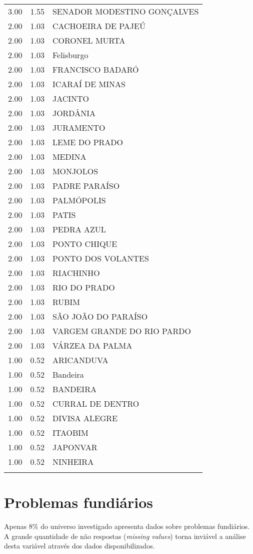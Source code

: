 \documentclass[a4paper, 12pt, openright, oneside, english, brazil, article]{abntex2}
\begin{document}
\begin{scriptsize}
\begin{longtable}{rrl}
		3.00 & 1.55 & SENADOR MODESTINO GONÇALVES \\ 
		2.00 & 1.03 & CACHOEIRA DE PAJEÚ \\ 
		2.00 & 1.03 & CORONEL MURTA \\ 
		2.00 & 1.03 & Felisburgo \\ 
		2.00 & 1.03 & FRANCISCO BADARÓ \\ 
		2.00 & 1.03 & ICARAÍ DE MINAS \\ 
		2.00 & 1.03 & JACINTO \\ 
		2.00 & 1.03 & JORDÂNIA \\ 
		2.00 & 1.03 & JURAMENTO \\ 
		2.00 & 1.03 & LEME DO PRADO \\ 
		2.00 & 1.03 & MEDINA \\ 
		2.00 & 1.03 & MONJOLOS \\ 
		2.00 & 1.03 & PADRE PARAÍSO \\ 
		2.00 & 1.03 & PALMÓPOLIS \\ 
		2.00 & 1.03 & PATIS \\ 
		2.00 & 1.03 & PEDRA AZUL \\ 
		2.00 & 1.03 & PONTO CHIQUE \\ 
		2.00 & 1.03 & PONTO DOS VOLANTES \\ 
		2.00 & 1.03 & RIACHINHO \\ 
		2.00 & 1.03 & RIO DO PRADO \\ 
		2.00 & 1.03 & RUBIM \\ 
		2.00 & 1.03 & SÃO JOÃO DO PARAÍSO \\ 
		2.00 & 1.03 & VARGEM GRANDE DO RIO PARDO \\ 
		2.00 & 1.03 & VÁRZEA DA PALMA \\ 
		1.00 & 0.52 & ARICANDUVA \\ 
		1.00 & 0.52 & Bandeira \\ 
		1.00 & 0.52 & BANDEIRA \\ 
		1.00 & 0.52 & CURRAL DE DENTRO \\ 
		1.00 & 0.52 & DIVISA ALEGRE \\ 
		1.00 & 0.52 & ITAOBIM \\ 
		1.00 & 0.52 & JAPONVAR \\ 
		1.00 & 0.52 & NINHEIRA \\ 
		\hline
		\hline
		\label{motivo4}
	\end{longtable}
	\end{scriptsize}

	
	\section{Problemas fundiários}
	Apenas 8\% do universo investigado apresenta dados sobre problemas fundiários. A grande quantidade de não respostas (\textit{missing values}) torna inviável a análise desta variável através dos dados disponibilizados.
	
\end{document}
